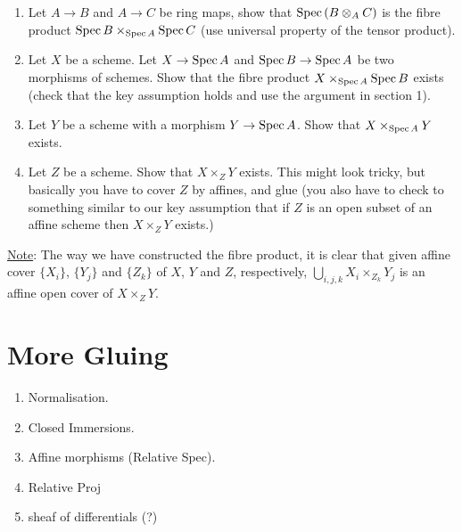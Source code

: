 \documentclass[10pt]{amsart}
\newcommand{\Spec}{{\rm Spec \,}}
\theoremstyle{definition}
\begin{document}
\begin{enumerate}\addtocounter{enumi}{-1}
	\item Let $A\rightarrow B$ and $A\rightarrow C$ be ring maps, show that $\Spec (B\otimes_A C)$ is the fibre product $\Spec B\times_{\Spec A} \Spec C$ (use universal property of the tensor product).
	\item  Let $X$ be a scheme. Let $X\rightarrow\Spec A$ and $\Spec B\rightarrow \Spec A$ be two morphisms of schemes. Show that the fibre product $X\times_{\Spec A}\Spec B$ exists (check that the key assumption holds and use the argument in section 1).
	\item Let $Y$ be a scheme with a morphism $Y\rightarrow \Spec A$. Show that $X\times_{\Spec A} Y$ exists.
	\item Let $Z$ be a scheme. Show that $X\times_Z Y$ exists. This might look tricky, but basically you have to cover $Z$ by affines, and glue (you also have to check to something similar to our key assumption that if $Z$ is an open subset of an affine scheme then $X\times_Z Y$ exists.)
	
\end{enumerate}

\underline{Note}: The way we have constructed the fibre product, it is clear that given affine cover $\lbrace X_i\rbrace$, $\lbrace Y_j\rbrace$ and $\lbrace Z_k\rbrace$ of $X$, $Y$ and $Z$, respectively,  $\bigcup_{i,j,k}X_i\times_{Z_k}Y_j$ is an affine open cover of $X\times_Z Y$.

\section{More Gluing}

\begin{enumerate}
	\item Normalisation.
	\item Closed Immersions.
	\item Affine morphisms (Relative Spec).
	\item Relative Proj
	\item sheaf of differentials (?)
\end{enumerate}

\end{document}
